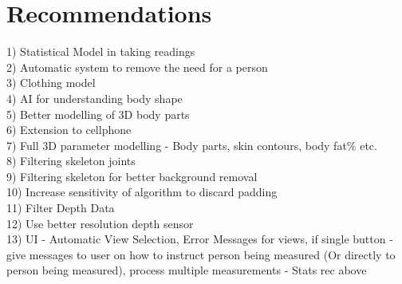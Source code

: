 \chapter{Recommendations} \label{recommendations}

1) Statistical Model in taking readings\\
2) Automatic system to remove the need for a person\\
3) Clothing model\\
4) AI for understanding body shape\\
5) Better modelling of 3D body parts\\
6) Extension to cellphone\\
7) Full 3D parameter modelling - Body parts, skin contours, body fat\% etc.\\
8) Filtering skeleton joints\\
9) Filtering skeleton for better background removal\\
10) Increase sensitivity of algorithm to discard padding\\
11) Filter Depth Data\\
12) Use better resolution depth sensor\\
13) UI - Automatic View Selection, Error Messages for views, if single button - give messages to user on how to instruct person being measured (Or directly to person being measured), process multiple measurements - Stats rec above\\ 
